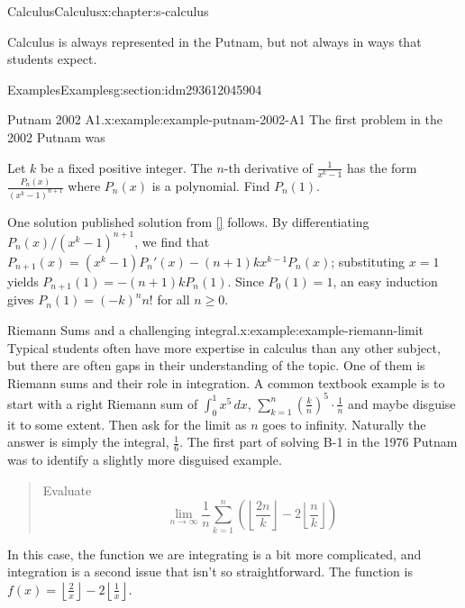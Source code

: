 \documentclass[twoside,10pt,]{book}
\newcommand{\xreffont}{\relax}
\numberwithin{equation}{section}
\begin{document}
\begin{chapterptx}{Calculus}{}{Calculus}{}{}{x:chapter:s-calculus}
\begin{introduction}{}%
Calculus is always represented in the Putnam, but not always in ways that students expect.%
\end{introduction}%
%
%
\typeout{************************************************}
\typeout{************************************************}
%
\begin{sectionptx}{Examples}{}{Examples}{}{}{g:section:idm293612045904}
\begin{example}{Putnam 2002 A1.}{x:example:example-putnam-2002-A1}%
The first problem in the 2002 Putnam was%
\par
Let \(k\) be a fixed positive integer. The \(n\)-th derivative of \(\frac{1}{x^k - 1}\) has the form \(\frac{P_n(x)}{(x^k - 1)^{n+1}}\) where \(P_n(x)\) is a polynomial. Find \(P_n(1)\).%
\par
One solution published solution from \hyperlink{x:biblio:biblio-putnam-archive}{[{\xreffont 10}]} follows.  By differentiating \(P_n(x)/(x^k-1)^{n+1}\), we find that \(P_{n+1}(x) = (x^k-1)P_n'(x)-(n+1)kx^{k-1}P_n(x)\); substituting \(x=1\) yields \(P_{n+1}(1) = -(n+1)k P_n(1)\).  Since \(P_0(1)=1\), an easy induction gives \(P_n(1) = (-k)^n n!\) for all \(n \geq 0\).%
\end{example}
\begin{example}{Riemann Sums and a challenging integral.}{x:example:example-riemann-limit}%
%
Typical students often have more expertise in calculus than any other subject, but there are often gaps in their understanding of the topic.  One of them is Riemann sums and their role in integration.  A common textbook example is to start with a right Riemann sum of \(\int_0^1 x^5 \, dx\), \(\sum _{k=1}^n \left(\frac{k}{n}\right)^5 \cdot \frac{1}{n}\) and maybe disguise it to some extent.  Then ask for the limit as \(n\) goes to infinity.  Naturally the answer is simply the integral, \(\frac{1}{6}\).   The first part of solving B-1 in the 1976 Putnam was to identify a slightly more disguised example.%
\begin{quote}%
Evaluate%
\begin{equation*}
\lim_{n\to\infty} \frac{1}{n} \sum _{k=1}^n \left(\left\lfloor
\frac{2 n}{k}\right\rfloor -2
\left\lfloor
\frac{n}{k}\right\rfloor \right) 
\end{equation*}
%
\end{quote}
In this case, the function we are integrating is a bit more complicated, and integration is a second issue that isn't so straightforward.  The function is \(f(x)= \left\lfloor \frac{2}{x}\right\rfloor - 2 \left\lfloor \frac{1}{x}\right\rfloor\).%

\end{example}
\end{sectionptx}
\end{chapterptx}
\end{document}
